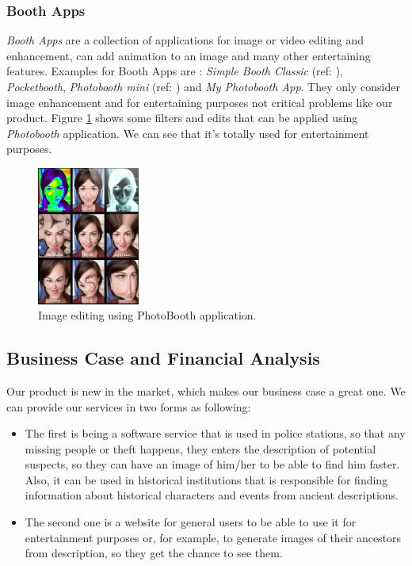\subsubsection{Booth Apps}
\emph{Booth Apps} are a collection of applications for image or video editing and enhancement, can add animation to an image and many other entertaining features. Examples for Booth Apps are : \emph{Simple Booth Classic} (ref:  ), \emph{Pocketbooth}, \emph{Photobooth mini} (ref: ) and \emph{My Photobooth App}. They only consider image enhancement and for entertaining purposes not critical problems like our product. Figure \ref{fig:photoBooth} shows some filters and edits that can be applied using \emph{Photobooth} application. We can see that it's totally used for entertainment purposes.

\begin{figure}[H]
    \centering
    \includegraphics[width=0.3\textwidth]{images/photoBooth.png}
    \caption{Image editing using PhotoBooth application.}
    \label{fig:photoBooth}
\end{figure}

\subsection{Business Case and Financial Analysis }

Our product is new in the market, which makes our business case a great one. We can provide our services in two forms as following:
\begin{itemize}
    \item The first is being a software service that is used in police stations, so that any missing people or theft happens, they enters the description of potential suspects, so they can have an image of him/her to be able to find him faster. Also, it can be used in historical institutions that is responsible for finding information about historical characters and events from ancient descriptions.
    \item The second one is a website for general users to be able to use it for entertainment purposes or, for example, to generate images of their ancestors from description, so they get the chance to see them.
\end{itemize}


